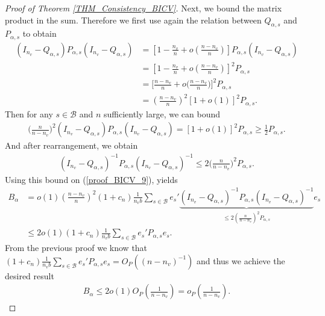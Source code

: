 \documentclass[Research_Module_ES.tex]{subfiles}
\begin{document}
\begin{proof}[Proof of Theorem \ref{THM_Consistency_BICV}]
	Next, we bound the matrix product in the sum. Therefore we first use again the relation between $Q_{\alpha,s}$ and $P_{\alpha,s}$ to obtain
	\begin{align*}
	(I_{n_v}-Q_{\alpha,s})P_{\alpha,s}(I_{n_v}-Q_{\alpha,s})
	&= \left[1-\frac{n_v}{n}+o\left(\frac{n-n_v}{n}\right)\right] P_{\alpha,s}(I_{n_v}-Q_{\alpha,s})\\
	&=\left[1-\frac{n_v}{n}+o\left(\frac{n-n_v}{n}\right)\right]^2 P_{\alpha,s}\\
	&=\biggl[\frac{n-n_v}{n}+o\biggl(\frac{n-n_v}{n}\biggr)\biggr]^2 P_{\alpha,s}\\
	&=\left(\frac{n-n_v}{n}\right)^2[1+o(1)]^2 P_{\alpha,s}.
	\end{align*}
	Then for any $s\in \mathcal{B}$ and $n$ sufficiently large, we can bound
	\begin{align*}
	\biggl(\frac{n}{n-n_v}\biggr)^2 (I_{n_v}-Q_{\alpha,s})P_{\alpha,s}(I_{n_v}-Q_{\alpha,s})=[1+o(1)]^2P_{\alpha,s}\ge \frac{1}{2}P_{\alpha,s}.
	\end{align*}
	And after rearrangement, we obtain 
	\begin{align*}
	(I_{n_v}-Q_{\alpha,s})^{-1}P_{\alpha,s}(I_{n_v}-Q_{\alpha,s})^{-1}\le 2 \biggl(\frac{n}{n-n_v}\biggr)^2P_{\alpha,s}.
	\end{align*}
	Using this bound on (\ref{proof_BICV_9}), yields
	\begin{align*}
	B_\alpha
	&=o(1)\left(\frac{n-n_v}{n}\right)^2(1+c_n)\frac{1}{n_vb}\sum_{s\in \mathcal{B}}e_s'\underbrace{(I_{n_v}-Q_{\alpha,s})^{-1}P_{\alpha,s}(I_{n_v}-Q_{\alpha,s})^{-1}}_{\le 2(\frac{n}{n-n_v})^2P_{\alpha,s}}e_s\\
	&\le 2o(1)(1+c_n)\frac{1}{n_vb}\sum_{s\in \mathcal{B}}e_s'P_{\alpha,s}e_s.
	\end{align*}
	From the previous proof we know that $(1+c_n)\frac{1}{n_vb}\sum_{s\in \mathcal{B}}e_s'P_{\alpha,s}e_s=O_P((n-n_v)^{-1})$ and thus we achieve the desired result
	\begin{align*}
	B_\alpha\le 2o(1)O_P\left(\frac{1}{n-n_v}\right)=o_P\left(\frac{1}{n-n_v}\right).
	\end{align*}
	

\end{proof}
\end{document}
